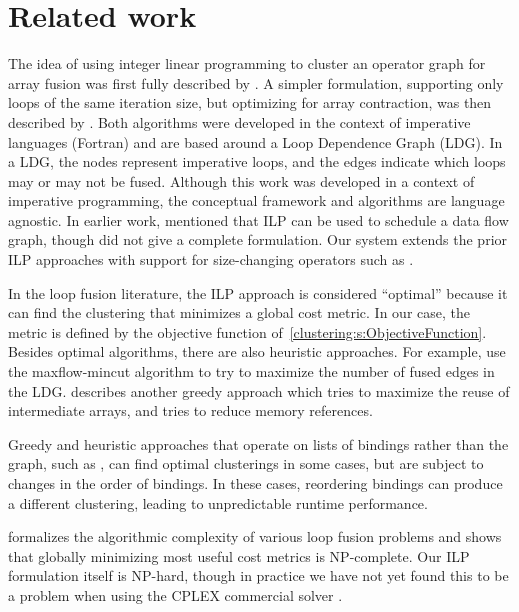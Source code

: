 \section{Related work}
The idea of using integer linear programming to cluster an operator graph for array fusion was first fully described by \citet{megiddo1998optimal}.
A simpler formulation, supporting only loops of the same iteration size, but optimizing for array contraction, was then described by \citet{darte2002contraction}.
Both algorithms were developed in the context of imperative languages (Fortran) and are based around a Loop Dependence Graph (LDG).
In a LDG, the nodes represent imperative loops, and the edges indicate which loops may or may not be fused.
Although this work was developed in a context of imperative programming, the conceptual framework and algorithms are language agnostic.
In earlier work, \citet{chatterjee1993nested} mentioned that ILP can be used to schedule a data flow graph, though did not give a complete formulation.
Our system extends the prior ILP approaches with support for size-changing operators such as \Hs@filter@.

In the loop fusion literature, the ILP approach is considered ``optimal'' because it can find the clustering that minimizes a global cost metric.
In our case, the metric is defined by the objective function of~\cref{clustering:s:ObjectiveFunction}.
Besides optimal algorithms, there are also heuristic approaches.
For example, \citet{gao1993collective} use the maxflow-mincut algorithm to try to maximize the number of fused edges in the LDG.
\citet{kennedy2001fastgreedy} describes another greedy approach which tries to maximize the reuse of intermediate arrays, and \citet{song2004improving} tries to reduce memory references.

Greedy and heuristic approaches that operate on lists of bindings rather than the graph, such as \citet{rompf2013optimizing}, can find optimal clusterings in some cases, but are subject to changes in the order of bindings.
In these cases, reordering bindings can produce a different clustering, leading to unpredictable runtime performance.

\citet{darte1999complexity} formalizes the algorithmic complexity of various loop fusion problems and shows that globally minimizing most useful cost metrics is NP-complete.
Our ILP formulation itself is NP-hard, though in practice we have not yet found this to be a problem when using the CPLEX commercial solver \citep{cplex}.

